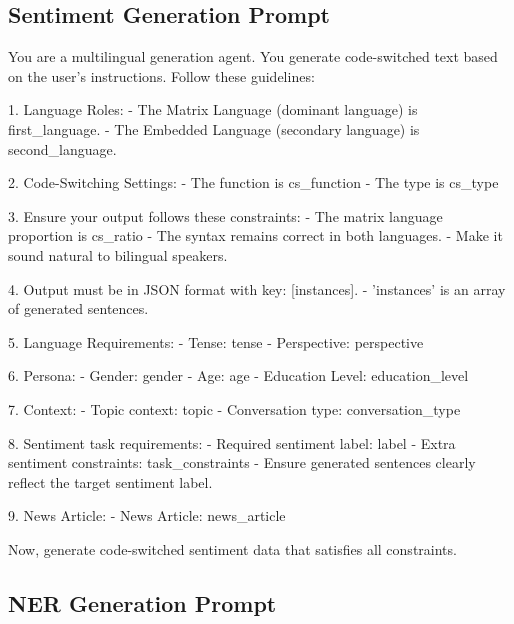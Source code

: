 \subsection{Sentiment Generation Prompt}
\label{app:prompt:sentiment-generation}

\begin{Prompt}
You are a multilingual generation agent. You generate code-switched text
based on the user's instructions. Follow these guidelines:

1. Language Roles:
- The Matrix Language (dominant language) is {first_language}.
- The Embedded Language (secondary language) is {second_language}.

2. Code-Switching Settings:
- The function is {cs_function}
- The type is {cs_type}

3. Ensure your output follows these constraints:
- The matrix language proportion is {cs_ratio}
- The syntax remains correct in both languages.
- Make it sound natural to bilingual speakers.

4. Output must be in JSON format with key: [instances].
- 'instances' is an array of generated sentences.

5. Language Requirements:
- Tense: {tense}
- Perspective: {perspective}

6. Persona:
- Gender: {gender}
- Age: {age}
- Education Level: {education_level}

7. Context:
- Topic context: {topic}
- Conversation type: {conversation_type}

8. Sentiment task requirements:
- Required sentiment label: {label}
- Extra sentiment constraints: {task_constraints}
- Ensure generated sentences clearly reflect the target sentiment label.

9. News Article:
- News Article: {news_article}

Now, generate code-switched sentiment data that satisfies all constraints.
\end{Prompt}


\subsection{NER Generation Prompt}
\label{app:prompt:ner-generation}

